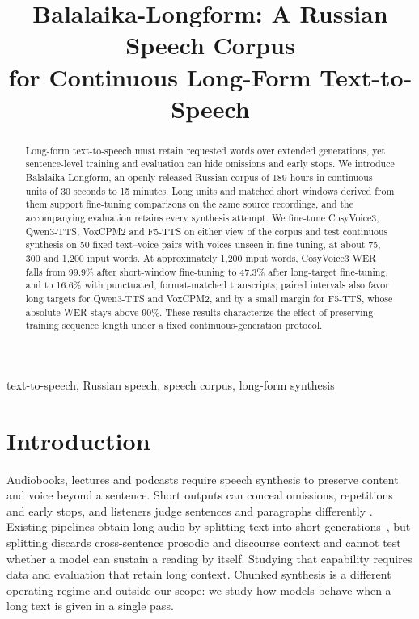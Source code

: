 \documentclass{article}
\title{Balalaika-Longform: A Russian Speech Corpus\\
for Continuous Long-Form Text-to-Speech}
\newcommand{\corpus}{Balalaika-Longform}
\begin{document}
\ninept
\maketitle

\begin{abstract}
Long-form text-to-speech must retain requested words over extended generations,
yet sentence-level training and evaluation can hide omissions and early stops.
We introduce \corpus{}, an openly released Russian corpus of 189 hours in
continuous units of 30 seconds to 15 minutes. Long units and matched short
windows derived from them support fine-tuning comparisons on the same source
recordings, and the accompanying evaluation retains every synthesis attempt. We fine-tune
CosyVoice3, Qwen3-TTS, VoxCPM2 and F5-TTS on either view of the corpus and test
continuous synthesis on 50 fixed text--voice pairs with voices unseen in
fine-tuning, at about 75, 300 and 1,200 input words. At approximately 1,200 input words, CosyVoice3 WER
falls from 99.9\% after short-window fine-tuning to 47.3\% after long-target
fine-tuning, and to 16.6\% with punctuated, format-matched transcripts; paired intervals
also favor long targets for Qwen3-TTS and VoxCPM2, and by a small margin for F5-TTS,
whose absolute WER stays above 90\%. These results characterize the effect of
preserving training sequence length under a fixed continuous-generation protocol.

\end{abstract}

\begin{keywords}
text-to-speech, Russian speech, speech corpus, long-form synthesis
\end{keywords}

\section{Introduction}
\label{sec:intro}

Audiobooks, lectures and podcasts require speech synthesis to preserve content
and voice beyond a sentence. Short outputs can conceal omissions, repetitions
and early stops, and listeners judge sentences and paragraphs differently
\cite{clark2019evaluating}. Existing pipelines obtain long audio by splitting
text into short generations~\cite{qwen2025cosyvoicecode,chen2026f5code}, but
splitting discards cross-sentence prosodic and discourse context and cannot test
whether a model can sustain a reading by itself. Studying that capability requires
data and evaluation that retain long context.  Chunked synthesis is a different
operating regime and outside our scope: we study how models behave when a long
text is given in a single pass.
\end{document}
